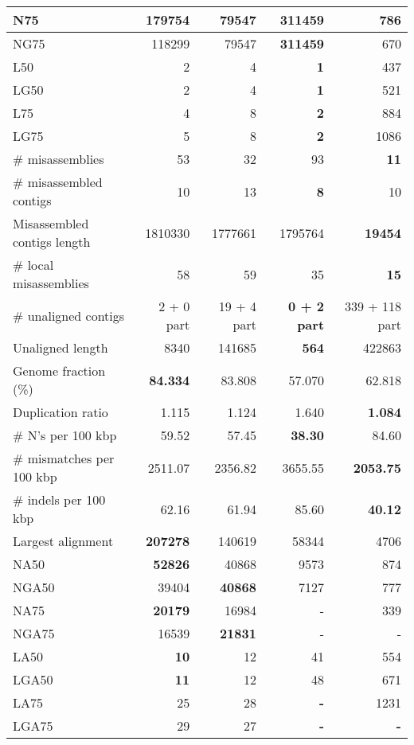 \documentclass[12pt,a4paper]{article}
\begin{document}
\begin{table}[ht]
\begin{center}
\begin{tabular}{|l*{4}{|r}|}
N75 & 179754 & 79547 & {\bf 311459} & 786 \\ \hline
NG75 & 118299 & 79547 & {\bf 311459} & 670 \\ \hline
L50 & 2 & 4 & {\bf 1} & 437 \\ \hline
LG50 & 2 & 4 & {\bf 1} & 521 \\ \hline
L75 & 4 & 8 & {\bf 2} & 884 \\ \hline
LG75 & 5 & 8 & {\bf 2} & 1086 \\ \hline
\# misassemblies & 53 & 32 & 93 & {\bf 11} \\ \hline
\# misassembled contigs & 10 & 13 & {\bf 8} & 10 \\ \hline
Misassembled contigs length & 1810330 & 1777661 & 1795764 & {\bf 19454} \\ \hline
\# local misassemblies & 58 & 59 & 35 & {\bf 15} \\ \hline
\# unaligned contigs & 2 + 0 part & 19 + 4 part & {\bf 0 + 2 part} & 339 + 118 part \\ \hline
Unaligned length & 8340 & 141685 & {\bf 564} & 422863 \\ \hline
Genome fraction (\%) & {\bf 84.334} & 83.808 & 57.070 & 62.818 \\ \hline
Duplication ratio & 1.115 & 1.124 & 1.640 & {\bf 1.084} \\ \hline
\# N's per 100 kbp & 59.52 & 57.45 & {\bf 38.30} & 84.60 \\ \hline
\# mismatches per 100 kbp & 2511.07 & 2356.82 & 3655.55 & {\bf 2053.75} \\ \hline
\# indels per 100 kbp & 62.16 & 61.94 & 85.60 & {\bf 40.12} \\ \hline
Largest alignment & {\bf 207278} & 140619 & 58344 & 4706 \\ \hline
NA50 & {\bf 52826} & 40868 & 9573 & 874 \\ \hline
NGA50 & 39404 & {\bf 40868} & 7127 & 777 \\ \hline
NA75 & {\bf 20179} & 16984 & - & 339 \\ \hline
NGA75 & 16539 & {\bf 21831} & - & - \\ \hline
LA50 & {\bf 10} & 12 & 41 & 554 \\ \hline
LGA50 & {\bf 11} & 12 & 48 & 671 \\ \hline
LA75 & 25 & 28 & {\bf -} & 1231 \\ \hline
LGA75 & 29 & 27 & {\bf -} & {\bf -} \\ \hline
\end{tabular}
\end{center}
\end{table}
\end{document}
